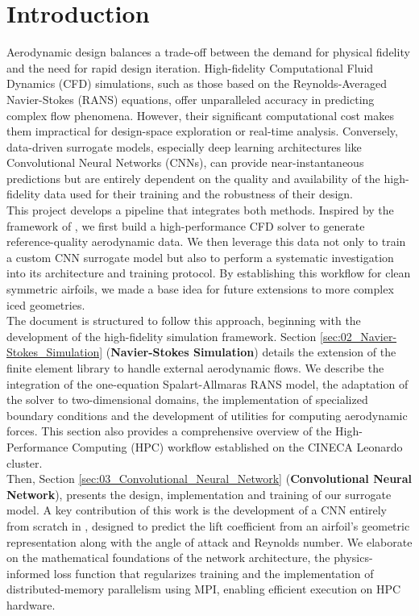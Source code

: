 \section{Introduction}
\label{sec:01_Introduction}

Aerodynamic design balances a trade-off between the demand for physical fidelity and the need for rapid design iteration. High-fidelity Computational Fluid Dynamics (CFD) simulations, such as those based on the Reynolds-Averaged Navier-Stokes (RANS) equations, offer unparalleled accuracy in predicting complex flow phenomena. However, their significant computational cost makes them impractical for design-space exploration or real-time analysis. Conversely, data-driven surrogate models, especially deep learning architectures like Convolutional Neural Networks (CNNs), can provide near-instantaneous predictions but are entirely dependent on the quality and availability of the high-fidelity data used for their training and the robustness of their design.\\

This project develops a pipeline that integrates both methods. Inspired by the framework of \citet{Cuozzo2026AIDriven}, we first build a high-performance CFD solver to generate reference-quality aerodynamic data. We then leverage this data not only to train a custom CNN surrogate model but also to perform a systematic investigation into its architecture and training protocol. By establishing this workflow for clean symmetric airfoils, we made a base idea for future extensions to more complex iced geometries.\\

The document is structured to follow this approach, beginning with the development of the high-fidelity simulation framework. Section \ref{sec:02_Navier-Stokes_Simulation} (\textbf{Navier-Stokes Simulation}) details the extension of the \textbf{\lifex} \cpp finite element library to handle external aerodynamic flows. We describe the integration of the one-equation Spalart-Allmaras RANS model, the adaptation of the solver to two-dimensional domains, the implementation of specialized boundary conditions and the development of utilities for computing aerodynamic forces. This section also provides a comprehensive overview of the High-Performance Computing (HPC) workflow established on the CINECA Leonardo cluster.\\

Then, Section \ref{sec:03_Convolutional_Neural_Network} (\textbf{Convolutional Neural Network}), presents the design, implementation and training of our surrogate model. A key contribution of this work is the development of a CNN entirely from scratch in \cpp, designed to predict the lift coefficient from an airfoil's geometric representation along with the angle of attack and Reynolds number. We elaborate on the mathematical foundations of the network architecture, the physics-informed loss function that regularizes training and the implementation of distributed-memory parallelism using MPI, enabling efficient execution on HPC hardware.\\


